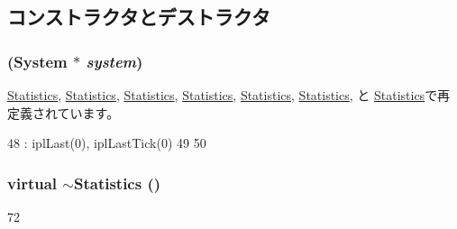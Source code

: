 \subsection{コンストラクタとデストラクタ}
\hypertarget{classKernel_1_1Statistics_a83aac6d65afe578fbf92b926ce7c1c3c}{
\subsubsection[{Statistics}]{ ({\bf System} $\ast$ {\em system})}}
\label{classKernel_1_1Statistics_a83aac6d65afe578fbf92b926ce7c1c3c}


\hyperlink{classAlphaISA_1_1Kernel_1_1Statistics_a83aac6d65afe578fbf92b926ce7c1c3c}{Statistics}, \hyperlink{classArmISA_1_1Kernel_1_1Statistics_a83aac6d65afe578fbf92b926ce7c1c3c}{Statistics}, \hyperlink{classMipsISA_1_1Kernel_1_1Statistics_a83aac6d65afe578fbf92b926ce7c1c3c}{Statistics}, \hyperlink{classMipsISA_1_1Kernel_1_1Statistics_a83aac6d65afe578fbf92b926ce7c1c3c}{Statistics}, \hyperlink{classPowerISA_1_1Kernel_1_1Statistics_a83aac6d65afe578fbf92b926ce7c1c3c}{Statistics}, \hyperlink{classSparcISA_1_1Kernel_1_1Statistics_a83aac6d65afe578fbf92b926ce7c1c3c}{Statistics}, と \hyperlink{classX86ISA_1_1Kernel_1_1Statistics_a83aac6d65afe578fbf92b926ce7c1c3c}{Statistics}で再定義されています。


\begin{DoxyCode}
48     : iplLast(0), iplLastTick(0)
49 {
50 }
\end{DoxyCode}
\hypertarget{classKernel_1_1Statistics_a1a489571e06ba279eb0653734ba026c5}{
\subsubsection[{$\sim$Statistics}]{\setlength{\rightskip}{0pt plus 5cm}virtual $\sim${\bf Statistics} ()}}
\label{classKernel_1_1Statistics_a1a489571e06ba279eb0653734ba026c5}



\begin{DoxyCode}
72 {}
\end{DoxyCode}


